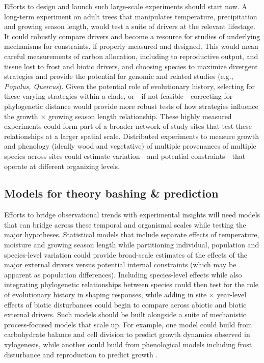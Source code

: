 \documentclass[11pt]{article}
\begin{document}
Efforts to design and launch such large-scale experiments should start now. A long-term experiment on adult trees that manipulates temperature, precipitation and growing season length, would test a suite of drivers at the relevant lifestage. It could robustly compare drivers and become a resource for studies of underlying mechanisms for constraints, if properly measured and designed. This would mean careful measurements of carbon allocation, including to reproductive output, and tissue lost to frost and biotic drivers, and choosing species to maximize divergent strategies and provide the potential for genomic and related studies (e.g., \emph{Populus, Quercus}). Given the potential role of evolutionary history, selecting for these varying strategies within a clade, or---if not feasible---correcting for phylogenetic distance would provide more robust tests of how strategies influence the growth $\times$ growing season length relationship. %
These highly measured experiments could form part of a broader network of study sites that test these relationships at a larger spatial scale. Distributed experiments to measure growth and phenology (ideally wood and vegetative) of multiple provenances of multiple species across sites could estimate variation---and potential constraints---that operate at different organizing levels. 

\subsection*{Models for theory bashing \& prediction}
Efforts to bridge observational trends with experimental insights will need models that can bridge across these temporal and organismal scales while testing the major hypotheses. %
Statistical models that include separate effects of temperature, moisture and growing season length while partitioning individual, population and species-level variation could provide broad-scale estimates of the effects of the major external drivers versus potential internal constraints (which may be apparent as population differences). Including species-level effects while also integrating phylogenetic relationships between species could then test for the role of evolutionary history in shaping responses, while adding in site $\times$ year-level effects of biotic disturbances could begin to compare across abiotic and biotic external drivers. Such models should be built alongside a suite of mechanistic process-focused models that scale up. For example, one model could build from carbohydrate balance and cell division \citep[see][]{locosselli2017dendrobiochemistry} to predict growth dynamics observed in xylogenesis, while another could build from phenological models including frost disturbance and reproduction to predict growth \citep{chuineJTB}. 
\end{document}
